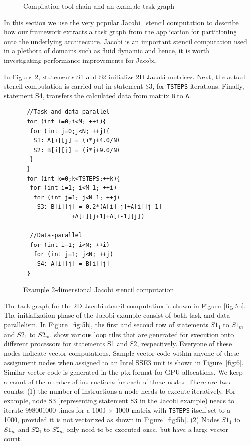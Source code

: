 \begin{figure}[t!]
{    \label{fig:5a}
  }
  \caption{Compilation tool-chain and an example task graph}
  \label{fig:5}
\end{figure}

In this section we use the very popular Jacobi~\cite{jacobi2} stencil
computation to describe how our framework extracts a task graph from the
application for partitioning onto the underlying architecture. Jacobi is
an important stencil computation used in a plethora of domains such as
fluid dynamic and hence, it is worth investigating performance
improvements for Jacobi.

In Figure~\ref{fig:4}, statements S1 and S2 initialize 2D Jacobi
matrices. Next, the actual stencil computation is carried out in
statement S3, for \texttt{TSTEPS} iterations. Finally, statement S4,
transfers the calculated data from matrix \texttt{B} to \texttt{A}.

\begin{scriptsize}
  \begin{figure}[h!]
    \centering
    \small{
\begin{verbatim}
 //Task and data-parallel
 for (int i=0;i<M; ++i){
  for (int j=0;j<N; ++j){
   S1: A[i][j] = (i*j+4.0/N)
   S2: B[i][j] = (i*j+9.0/N)
  }
 }
 for (int k=0;k<TSTEPS;++k){
  for (int i=1; i<M-1; ++i)
   for (int j=1; j<N-1; ++j)
    S3: B[i][j] = 0.2*(A[i][j]+A[i][j-1]
              +A[i][j+1]+A[i-1][j])

  //Data-parallel
  for (int i=1; i<M; ++i)
   for (int j=1; j<N; ++j)
    S4: A[i][j] = B[i][j]
 }
\end{verbatim}
    }
    \caption{Example 2-dimensional Jacobi stencil computation}
    \label{fig:4}
  \end{figure}
\end{scriptsize}

The task graph for the 2D Jacobi stencil computation is shown in
Figure~\ref{fig:5b}. The initialization phase of the Jacobi example
consist of both task and data parallelism. In Figure~\ref{fig:5b}, the
first and second row of statements $S1_1$ to $S1_m$ and $S2_1$ to
$S2_m$, show various loop tiles that are generated for execution onto
different processors for statements S1 and S2, respectively. Everyone of
these nodes indicate vector computations. Sample vector code within
anyone of these assignment nodes when assigned to an Intel SSE3 unit is
shown in Figure~\ref{fig:6}. Similar vector code is generated in the ptx
format for GPU allocations. We keep a count of the number of
instructions for each of these nodes. There are two counts: (1) the
number of instructions a node needs to execute iteratively. For example,
node S3 (representing statement S3 in the Jacobi example) needs to
iterate 998001000 times for a 1000 $\times$ 1000 matrix with
\texttt{TSTEPS} itself set to a 1000, provided it is not vectorized as
shown in Figure~\ref{fig:5b}. (2) Nodes $S1_1$ to $S1_m$ and $S2_1$ to
$S2_m$ only need to be executed once, but have a large vector count.

